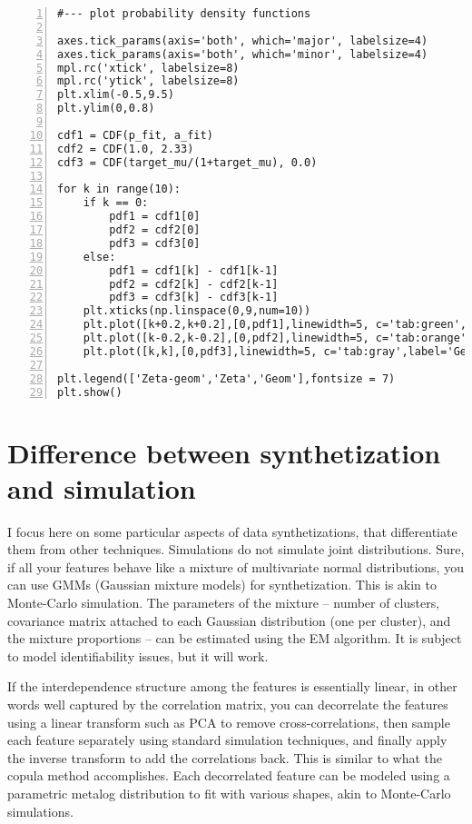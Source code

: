 \documentclass[oneside,10pt]{book}
\begin{document}
\begin{lstlisting}[numbers=left]
#--- plot probability density functions

axes.tick_params(axis='both', which='major', labelsize=4)
axes.tick_params(axis='both', which='minor', labelsize=4)
mpl.rc('xtick', labelsize=8) 
mpl.rc('ytick', labelsize=8) 
plt.xlim(-0.5,9.5)
plt.ylim(0,0.8)

cdf1 = CDF(p_fit, a_fit) 
cdf2 = CDF(1.0, 2.33) 
cdf3 = CDF(target_mu/(1+target_mu), 0.0) 

for k in range(10):
    if k == 0:
        pdf1 = cdf1[0]
        pdf2 = cdf2[0]
        pdf3 = cdf3[0]
    else:
        pdf1 = cdf1[k] - cdf1[k-1]
        pdf2 = cdf2[k] - cdf2[k-1]
        pdf3 = cdf3[k] - cdf3[k-1]
    plt.xticks(np.linspace(0,9,num=10))
    plt.plot([k+0.2,k+0.2],[0,pdf1],linewidth=5, c='tab:green', label='Zeta-geom')
    plt.plot([k-0.2,k-0.2],[0,pdf2],linewidth=5, c='tab:orange',label='Zeta')
    plt.plot([k,k],[0,pdf3],linewidth=5, c='tab:gray',label='Geom')

plt.legend(['Zeta-geom','Zeta','Geom'],fontsize = 7)
plt.show()
\end{lstlisting}

\section{Difference between synthetization and simulation}


I focus here on some particular aspects of data synthetizations, that differentiate them from other techniques.
Simulations do not simulate joint distributions.
Sure, if all your features behave like a mixture of multivariate normal distributions, you can use GMMs (Gaussian mixture models) for synthetization. This is akin to 
\textcolor{index}{Monte-Carlo simulation}. The parameters of the mixture -- number of clusters, covariance matrix attached to each Gaussian distribution (one per cluster), and the mixture proportions -- can be estimated using the EM algorithm. It is subject to \textcolor{index}{model identifiability} issues, but it will work.

If the interdependence structure among the features is essentially linear, in other words well captured by the correlation matrix, you can decorrelate the features using a linear transform such as PCA to remove cross-correlations, then sample each feature separately using standard simulation techniques, and finally apply the inverse transform to add the correlations back. This is similar to what the copula method accomplishes. Each decorrelated feature can be modeled using a parametric \textcolor{index}{metalog distribution} to fit with various shapes, akin to Monte-Carlo simulations.
\end{document}
